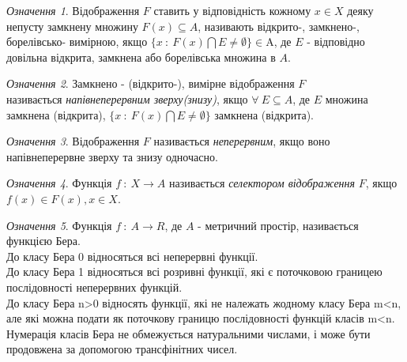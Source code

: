 \documentclass[a4paper, 14pt]{extarticle}
\newcommand{\Alpha}{\mathrm{A}}
\begin{document}
\textit{Означення 1}. Відображення $F$ ставить у відповідність кожному $x \in X$ деяку непусту замкнену множину $F(x) \subseteq A $, називають відкрито-, замкнено-, борелівсько- вимірною, якщо $\lbrace x\ : \ F(x)\bigcap E  \neq \emptyset \rbrace \in \Alpha$, де $E$ - відповідно довільна відкрита, замкнена або борелівська множина в $A$.
\newline \par

\textit{Означення 2}. Замкнено - (відкрито-),  вимірне відображення $F$\\ називається \textit{напівнеперервним зверху(знизу)}, якщо $\forall \ E \subseteq A$, де  $E$ множина замкнена (відкрита), $\lbrace x\ : \ F(x)\bigcap E  \neq \emptyset \rbrace$ замкнена (відкрита).
\newline \par

\textit{Означення 3}. Відображення $F$ називається \textit{неперервним}, якщо воно напівнеперервне зверху та знизу одночасно.\newline\par

\textit{Означення 4}. Функція $f \ : \ X \rightarrow A$ називається  \textit{селектором відображення} $F$, якщо $f(x) \in F(x), x \in X$.\newline\par
\textit{Означення 5}. Функція $f \ : \ A\rightarrow R$, де $A$ - метричний простір, називається функцією Бера.\\
До класу Бера 0 відносяться всі неперервні функції.\\
До класу Бера 1 відносяться всі розривні функції, які є поточковою границею послідовності неперервних функцій.\\
До класу Бера n>0 відносять функції, які не належать жодному класу Бера m<n, але які можна подати як поточкову границю послідовності функцій класів m<n.
Нумерація класів Бера не обмежується натуральними числами, і може бути продовжена за допомогою трансфінітних чисел.\newline\newline
\end{document}
